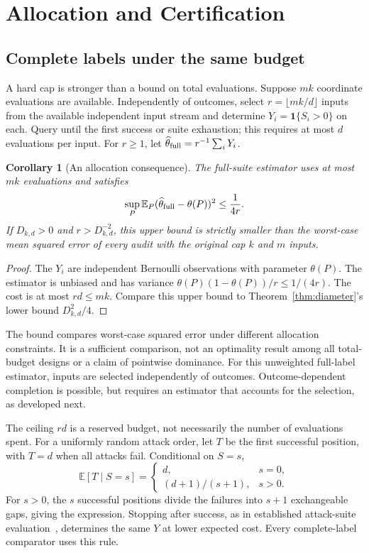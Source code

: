 \documentclass[conference]{IEEEtran}
\newtheorem{corollary}[theorem]{Corollary}
\newcommand{\E}{\mathbb{E}}
\newcommand{\ind}{\mathbf{1}}
\begin{document}
\section{Allocation and Certification}\label{sec:budget}
\subsection{Complete labels under the same budget}
A hard cap is stronger than a bound on total evaluations. Suppose $mk$ coordinate evaluations are available. Independently of outcomes, select $r=\lfloor mk/d\rfloor$ inputs from the available independent input stream and determine $Y_i=\ind\{S_i>0\}$ on each. Query until the first success or suite exhaustion; this requires at most $d$ evaluations per input. For $r\geq1$, let $\widehat\theta_{\rm full}=r^{-1}\sum_iY_i$.

\begin{corollary}[An allocation consequence]\label{thm:budget}
The full-suite estimator uses at most $mk$ evaluations and satisfies
\begin{equation}\label{eq:fullmse}
 \sup_P\E_P(\widehat\theta_{\rm full}-\theta(P))^2
 \leq\frac{1}{4r}.
\end{equation}
If $D_{k,d}>0$ and $r>D_{k,d}^{-2}$, this upper bound is strictly smaller than the worst-case mean squared error of every audit with the original cap $k$ and $m$ inputs.
\end{corollary}
\begin{proof}
The $Y_i$ are independent Bernoulli observations with parameter $\theta(P)$. The estimator is unbiased and has variance $\theta(P)(1-\theta(P))/r\leq1/(4r)$. The cost is at most $rd\leq mk$. Compare this upper bound to Theorem~\ref{thm:diameter}'s lower bound $D_{k,d}^2/4$.
\end{proof}

The bound compares worst-case squared error under different allocation constraints. It is a sufficient comparison, not an optimality result among all total-budget designs or a claim of pointwise dominance. For this unweighted full-label estimator, inputs are selected independently of outcomes. Outcome-dependent completion is possible, but requires an estimator that accounts for the selection, as developed next.

The ceiling $rd$ is a reserved budget, not necessarily the number of evaluations spent. For a uniformly random attack order, let $T$ be the first successful position, with $T=d$ when all attacks fail. Conditional on $S=s$,
\begin{equation}\label{eq:fullcost}
 \E[T\mid S=s]=
 \begin{cases}d,&s=0,\\(d+1)/(s+1),&s>0.\end{cases}
\end{equation}
For $s>0$, the $s$ successful positions divide the failures into $s+1$ exchangeable gaps, giving the expression. Stopping after success, as in established attack-suite evaluation~\cite{autocode}, determines the same $Y$ at lower expected cost. Every complete-label comparator uses this rule.
\end{document}
